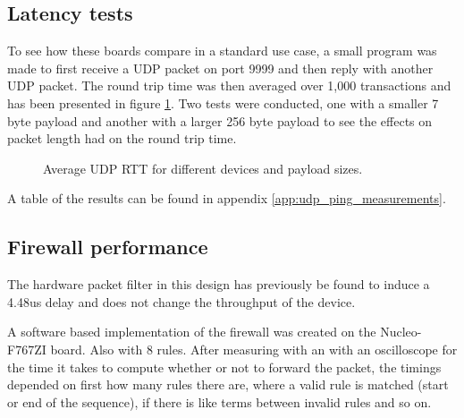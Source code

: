 \subsection{Latency tests}
To see how these boards compare in a standard use case, a small program was made to first receive a UDP packet on port 9999 and then reply with another UDP packet. The round trip time was then averaged over 1,000 transactions and has been presented in figure \ref{fig:avg_udp_rtt}. Two tests were conducted, one with a smaller 7 byte payload and another with a larger 256 byte payload to see the effects on packet length had on the round trip time. 

\begin{figure}[ht]
    \centering
    \caption{Average UDP RTT for different devices and payload sizes.}
    \label{fig:avg_udp_rtt}
    \end{figure}
    
A table of the results can be found in appendix \ref{app:udp_ping_measurements}.

\subsection{Firewall performance}

The hardware packet filter in this design has previously be found to induce a 4.48us delay and does not change the throughput of the device. 

A software based implementation of the firewall was created on the Nucleo-F767ZI board. Also with 8 rules. After measuring with an with an oscilloscope for the time it takes to compute whether or not to forward the packet, the timings depended on first how many rules there are, where a valid rule is matched (start or end of the sequence), if there is like terms between invalid rules and so on. 

